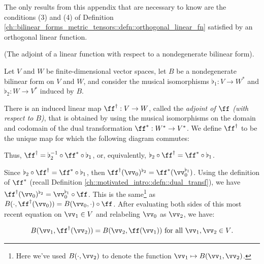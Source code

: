 The only results from this appendix that are necessary to know are the conditions (3) and (4) of Definition \ref{ch::bilinear_forms_metric_tensors::defn::orthogonal_linear_fn} satisfied by an orthogonal linear function.

\begin{deriv}
\label{ch::appendix::defn::dual_transf_after_id}
    (The adjoint of a linear function with respect to a nondegenerate bilinear form).
    
    Let $V$ and $W$ be finite-dimensional vector spaces, let $B$ be a nondegenerate bilinear form on $V$ and $W$, and consider the musical isomorphisms $\flat_1:V \rightarrow W^{*}$ and $\flat_2:W \rightarrow V^{*}$ induced by $B$.
    
    There is an induced linear map $\ff^\dag:V \rightarrow W$, called the \textit{adjoint of $\ff$ (with respect to $B$)}, that is obtained by using the musical isomorphisms on the domain and codomain of the dual transformation $\ff^*:W^* \rightarrow V^*$. We define $\ff^\dag$ to be the unique map for which the following diagram commutes:
    
    \begin{center}
    \end{center}
    
    Thus, $\ff^\dag = \flat_2^{-1} \circ \ff^* \circ \flat_1$, or, equivalently, $\flat_2 \circ \ff^\dag = \ff^* \circ \flat_1$.
    
    Since $\flat_2 \circ \ff^\dag = \ff^* \circ \flat_1$, then $\ff^\dag(\vv_0)^{\flat_2} = \ff^*(\vv_0^{\flat_1})$. Using the definition of $\ff^*$ (recall Definition \ref{ch::motivated_intro::defn::dual_transf}), we have $\ff^\dag(\vv_0)^{\flat_2} = \vv_0^{\flat_1} \circ \ff$. This is the same\footnote{Here we've used $B(\cdot, \vv_2)$ to denote the function $\vv_1 \mapsto B(\vv_1, \vv_2)$.} as $B(\cdot, \ff^\dag(\vv_0)) = B(\vv_0, \cdot) \circ \ff$. After evaluating both sides of this most recent equation on $\vv_1 \in V$ and relabeling $\vv_0$ as $\vv_2$, we have:
    
    \begin{align*}
        B(\vv_1, \ff^\dag(\vv_2)) = B(\vv_2, \ff(\vv_1)) \text{ for all $\vv_1, \vv_2 \in V$}.
    \end{align*}
\end{deriv}

